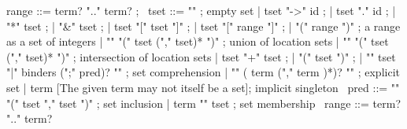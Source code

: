 \begin{syntax}
  range ::= term? ".." term? ;
       \
  tset ::= "\empty" ; empty set
       | tset "->" id ;
       | tset "." id ;
       | "*" tset ;
       | "&" tset ;
       | tset "[" tset "]" ;
       | tset "[" range "]" ;
       | "(" range ")" ; a range as a set of integers
       | "\union" "(" tset ("," tset)* ")" ; union of location sets
       | "\inter" "(" tset ("," tset)* ")" ; intersection of location sets
       | tset "+" tset ;
       | "(" tset ")" ;
       | "{" tset "|" binders (";" pred)? "}" ; set comprehension
       | { "{" ( term ("," term )*)? "}" } ; explicit set
       | term [The given term may not itself be a set]; implicit singleton
       \
  pred ::= "\subset" "(" tset "," tset ")" ; set inclusion
       | term "\in" tset ; set membership
       \
  range ::= term? ".." term?
\end{syntax}


